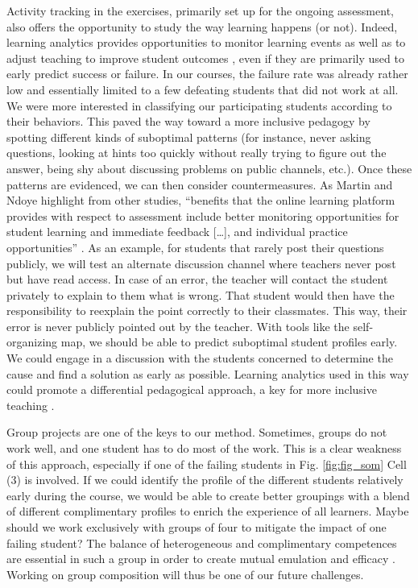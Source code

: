 \documentclass{aims}
\theoremstyle{definition}
\begin{document}
Activity tracking in the exercises, primarily set up for the ongoing
assessment, also offers the opportunity to study the way learning
happens (or not). Indeed, learning analytics provides opportunities to
monitor learning events as well as to adjust teaching to improve student
outcomes \cite{Martin2016, Romero2020}, even if they are primarily used
to early predict success or failure. In our courses, the failure rate
was already rather low and essentially limited to a few defeating
students that did not work at all. We were more interested in
classifying our participating students according to their behaviors.
This paved the way toward a more inclusive pedagogy by spotting
different kinds of suboptimal patterns (for instance, never asking
questions, looking at hints too quickly without really trying to figure
out the answer, being shy about discussing problems on public channels,
etc.). Once these patterns are evidenced, we can then consider
countermeasures. As Martin and Ndoye highlight from other studies,
``benefits that the online learning platform provides with respect to
assessment include better monitoring opportunities for student learning
and immediate feedback {[}\ldots{]}, and individual practice
opportunities'' \cite{Martin2016}. As an example, for students that
rarely post their questions publicly, we will test an alternate
discussion channel where teachers never post but have read access. In
case of an error, the teacher will contact the student privately to
explain to them what is wrong. That student would then have the
responsibility to reexplain the point correctly to their classmates.
This way, their error is never publicly pointed out by the teacher. With
tools like the self-organizing map, we should be able to predict
suboptimal student profiles early. We could engage in a discussion with
the students concerned to determine the cause and find a solution as
early as possible. Learning analytics used in this way could promote a
differential pedagogical approach, a key for more inclusive teaching
\cite{Siemens2013}.

Group projects are one of the keys to our method. Sometimes, groups do
not work well, and one student has to do most of the work. This is a
clear weakness of this approach, especially if one of the failing
students in Fig. \ref {fig:fig_som} Cell (3) is involved. If we could
identify the profile of the different students relatively early during
the course, we would be able to create better groupings with a blend of
different complimentary profiles to enrich the experience of all
learners. Maybe should we work exclusively with groups of four to
mitigate the impact of one failing student? The balance of heterogeneous
and complimentary competences are essential in such a group in order to
create mutual emulation and efficacy \cite{Mucchielli1996}. Working on
group composition will thus be one of our future challenges.
\end{document}
